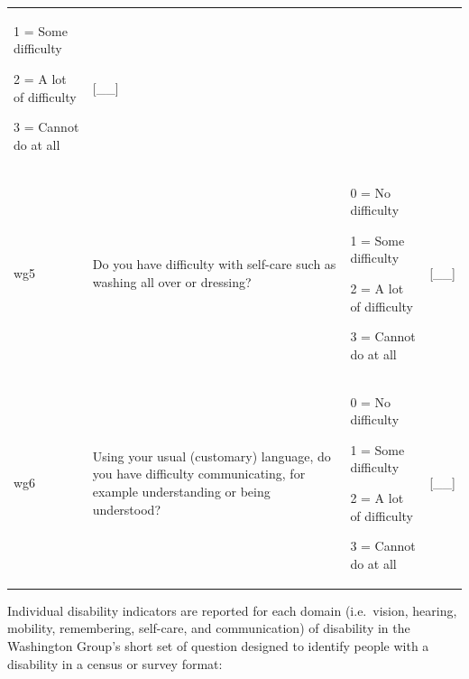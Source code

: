 \documentclass[12pt,a4paper]{book}
\theoremstyle{definition}
\theoremstyle{definition}
\theoremstyle{definition}
\theoremstyle{remark}
\begin{document}
\begin{longtable}[]{@{}llll@{}}
\begin{minipage}[t]{0.24\columnwidth}
1 = Some difficulty

2 = A lot of difficulty

3 = Cannot do at all\strut
\end{minipage} & \begin{minipage}[t]{0.24\columnwidth}\raggedright
{[}\_\_{]}\strut
\end{minipage}\tabularnewline
\begin{minipage}[t]{0.24\columnwidth}\raggedright
wg5\strut
\end{minipage} & \begin{minipage}[t]{0.24\columnwidth}\raggedright
Do you have difficulty with self-care such as washing all over or
dressing?\strut
\end{minipage} & \begin{minipage}[t]{0.24\columnwidth}\raggedright
0 = No difficulty

1 = Some difficulty

2 = A lot of difficulty

3 = Cannot do at all\strut
\end{minipage} & \begin{minipage}[t]{0.24\columnwidth}\raggedright
{[}\_\_{]}\strut
\end{minipage}\tabularnewline
\begin{minipage}[t]{0.24\columnwidth}\raggedright
wg6\strut
\end{minipage} & \begin{minipage}[t]{0.24\columnwidth}\raggedright
Using your usual (customary) language, do you have difficulty
communicating, for example understanding or being understood?\strut
\end{minipage} & \begin{minipage}[t]{0.24\columnwidth}\raggedright
0 = No difficulty

1 = Some difficulty

2 = A lot of difficulty

3 = Cannot do at all\strut
\end{minipage} & \begin{minipage}[t]{0.24\columnwidth}\raggedright
{[}\_\_{]}\strut
\end{minipage}\tabularnewline
\bottomrule
\end{longtable}

Individual disability indicators are reported for each domain
(i.e.~vision, hearing, mobility, remembering, self-care, and
communication) of disability in the Washington Group's short set of
question designed to identify people with a disability in a census or
survey format:
\end{document}
